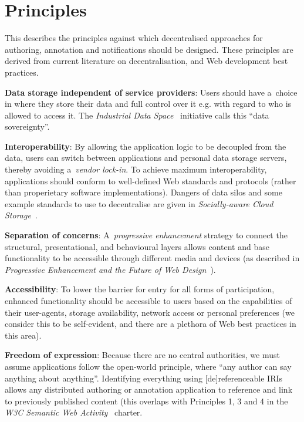 \documentclass[a4paper]{llncs}
\begin{document}
\section{Principles}
\label{principles}

\par This describes the principles against which decentralised approaches for authoring, annotation and notifications should be designed. These principles are derived from current literature on decentralisation, and Web development best practices.

\par \textbf{Data storage independent of service providers}: Users should have a choice in where they store their data and full control over it e.g. with regard to who is allowed to access it. The \textit{Industrial Data Space}~\cite{ref-1} initiative calls this ``data sovereignty''.

\par \textbf{Interoperability}: By allowing the application logic to be decoupled from the data, users can switch between applications and personal data storage servers, thereby avoiding a \textit{vendor lock-in}. To achieve maximum interoperability, applications should conform to well-defined Web standards and protocols (rather than properietary software implementations). Dangers of data silos and some example standards to use to decentralise are given in \textit{Socially-aware Cloud Storage}~\cite{ref-2}.

\par \textbf{Separation of concerns}: A \textit{progressive enhancement} strategy to connect the structural, presentational, and behavioural layers allows content and base functionality to be accessible through different media and devices (as described in \textit{Progressive Enhancement and the Future of Web Design}~\cite{ref-3}).

\par \textbf{Accessibility}: To lower the barrier for entry for all forms of participation, enhanced functionality should be accessible to users based on the capabilities of their user-agents, storage availability, network access or personal preferences (we consider this to be self-evident, and there are a plethora of Web best practices in this area).

\par \textbf{Freedom of expression}: Because there are no central authorities, we must assume applications follow the open-world principle, where ``any author can say anything about anything''. Identifying everything using [de]referenceable IRIs allows any distributed authoring or annotation application to reference and link to previously published content (this overlaps with Principles 1, 3 and 4 in the \textit{W3C Semantic Web Activity}~\cite{ref-4} charter.
\end{document}
